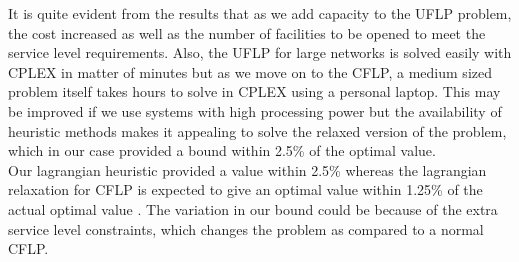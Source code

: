 \documentclass[12pt]{article}
\numberwithin{equation}{section}
\begin{document}
It is quite evident from the results that as we add capacity to the UFLP problem, the cost increased as well as the number of facilities to be opened to meet the service level requirements. Also, the UFLP for large networks is solved easily with CPLEX in matter of minutes but as we move on to the CFLP, a medium sized problem itself takes hours to solve in CPLEX using a personal laptop. This may be improved if we use systems with high processing power but the availability of heuristic methods makes it appealing to solve the relaxed version of the problem, which in our case provided a bound within 2.5\% of the optimal value.\\ 

Our lagrangian heuristic provided a value within 2.5\% whereas the lagrangian relaxation for CFLP is expected to give an optimal value within 1.25\% of the actual optimal value \cite{CFL}. The variation in our bound could be because of the extra service level constraints, which changes the problem as compared to a normal CFLP. \\
\end{document}
